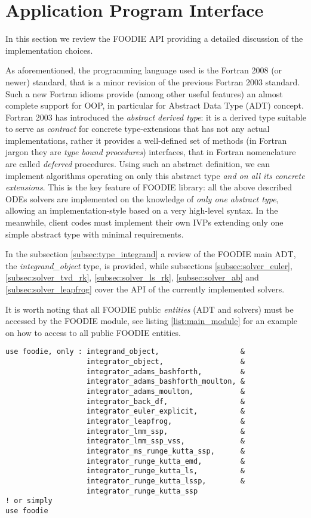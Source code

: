 \section{Application Program Interface}\label{sec:API}

In this section we review the FOODIE API providing a detailed discussion of the implementation choices.

As aforementioned, the programming language used is the Fortran 2008 (or newer) standard, that is a minor revision of the previous Fortran 2003 standard. Such a new Fortran idioms provide (among other useful features) an almost complete support for OOP, in particular for Abstract Data Type (ADT) concept. Fortran 2003 has introduced the \emph{abstract derived type}: it is a derived type suitable to serve as \emph{contract} for concrete type-extensions that has not any actual implementations, rather it provides a well-defined set of methods (in Fortran jargon they are \emph{type bound procedures}) interfaces, that in Fortran nomenclature are called \emph{deferred} procedures. Using such an abstract definition, we can implement algorithms operating on only this abstract type \emph{and on all its concrete extensions}. This is the key feature of FOODIE library: all the above described ODEs solvers are implemented on the knowledge of \emph{only one abstract type}, allowing an implementation-style based on a very high-level syntax. In the meanwhile, client codes must implement their own IVPs extending only one simple abstract type with minimal requirements.

In the subsection \ref{subsec:type_integrand} a review of the FOODIE main ADT, the \emph{integrand\_object} type, is provided, while subsections \ref{subsec:solver_euler}, \ref{subsec:solver_tvd_rk}, \ref{subsec:solver_ls_rk}, \ref{subsec:solver_ab} and \ref{subsec:solver_leapfrog} cover the API of the currently implemented solvers.

It is worth noting that all FOODIE public \emph{entities} (ADT and solvers) must be accessed by the FOODIE module, see listing \ref{list:main_module} for an example on how to access to all public FOODIE entities.

\begin{lstlisting}[firstnumber=1,style=code,caption={usage example importing all public entities of FOODIE main module},label={list:main_module}]
use foodie, only : integrand_object,                   &
                   integrator_object,                  &
                   integrator_adams_bashforth,         &
                   integrator_adams_bashforth_moulton, &
                   integrator_adams_moulton,           &
                   integrator_back_df,                 &
                   integrator_euler_explicit,          &
                   integrator_leapfrog,                &
                   integrator_lmm_ssp,                 &
                   integrator_lmm_ssp_vss,             &
                   integrator_ms_runge_kutta_ssp,      &
                   integrator_runge_kutta_emd,         &
                   integrator_runge_kutta_ls,          &
                   integrator_runge_kutta_lssp,        &
                   integrator_runge_kutta_ssp
! or simply
use foodie
\end{lstlisting}


